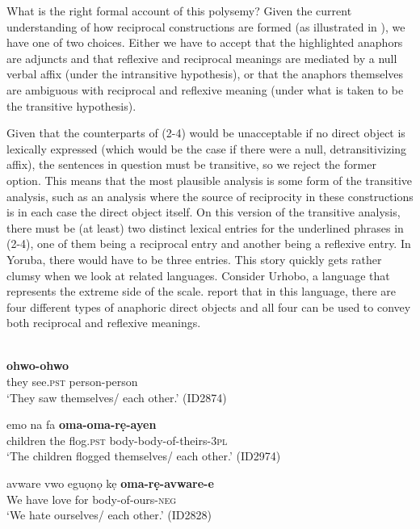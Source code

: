 \documentclass[output=paper]{langsci/langscibook}
\begin{document}
  What is the right formal account of this polysemy? Given the current understanding of how reciprocal constructions are formed (as illustrated in ), we have one of two choices. Either we have to accept that the highlighted anaphors are adjuncts and that reflexive and reciprocal meanings are mediated by a null verbal affix (under the intransitive hypothesis), or that the anaphors themselves are ambiguous with reciprocal and reflexive meaning (under what is taken to be the transitive hypothesis). 

  Given that the counterparts of (2-4) would be unacceptable if no direct object is lexically expressed (which would be the case if there were a null, detransitivizing affix), the sentences in question must be transitive, so we reject the former option. This means that the most plausible analysis is some form of the transitive analysis, such as an analysis where the source of reciprocity in these constructions is in each case the direct object itself. On this version of the transitive analysis, there must be (at least) two distinct lexical entries for the underlined phrases in (2-4), one of them being a reciprocal entry and another being a reflexive entry. In Yoruba, there would have to be three entries. This story quickly gets rather clumsy when we look at related languages. Consider Urhobo, a language that represents the extreme side of the scale. \citet{AzizaSafir2006} report that in this language, there are four different types of anaphoric direct objects and all four can be used to convey both reciprocal and reflexive meanings. 


\ea\label{ex:}
 \\
\ea\label{ex:}
     \textbf{{ohwo-ohwo}} \\
       they   see.\textsc{pst}   person-person \\
\glt   ‘They saw themselves/ each other.’ (ID2874)

\ex
\gll emo    na  fa    \textbf{{oma-oma-rẹ-ayen}}\\
 children  the  flog.\textsc{pst}  body-body-of-theirs-\textsc{3pl}\\
\glt   ‘The children flogged themselves/ each other.’ (ID2974)

\ex
\glt avware   vwo  eguọnọ   kẹ   \textbf{oma-rẹ-avware-e}\\
       We     have   love     for   body-of-ours-\textsc{neg}  \\
\glt   ‘We hate ourselves/ each other.’  (ID2828)
\end{document}
